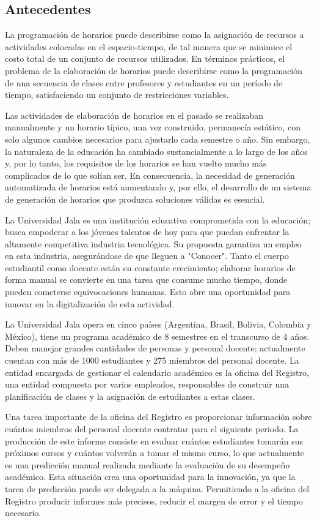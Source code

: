 \subsection{Antecedentes}
La programación de horarios puede describirse como la asignación de recursos a actividades colocadas en el espacio-tiempo, de tal manera que se minimice el costo total de un conjunto de recursos utilizados.
En términos prácticos, el problema de la elaboración de horarios puede describirse como la programación de una secuencia de clases entre profesores y estudiantes en un período de tiempo, satisfaciendo un conjunto de restricciones variables.

Las actividades de elaboración de horarios en el pasado se realizaban manualmente y un horario típico, una vez construido, permanecía estático, con solo algunos cambios necesarios para ajustarlo cada semestre o año.
Sin embargo, la naturaleza de la educación ha cambiado sustancialmente a lo largo de los años y, por lo tanto, los requisitos de los horarios se han vuelto mucho más complicados de lo que solían ser. 
En consecuencia, la necesidad de generación automatizada de horarios está aumentando y, por ello, el desarrollo de un sistema de generación de horarios que produzca soluciones válidas es esencial.

La Universidad Jala es una institución educativa comprometida con la educación; busca empoderar a los jóvenes talentos de hoy para que puedan enfrentar la altamente competitiva industria tecnológica. 
Su propuesta garantiza un empleo en esta industria, asegurándose de que lleguen a "Conocer". Tanto el cuerpo estudiantil como docente están en constante crecimiento; elaborar horarios de forma manual se convierte en una tarea que consume mucho tiempo, donde pueden cometerse equivocaciones humanas. Esto abre una oportunidad para innovar en la digitalización de esta actividad.

La Universidad Jala opera en cinco países (Argentina, Brasil, Bolivia, Colombia y México), tiene un programa académico de 8 semestres en el transcurso de 4 años. Deben manejar grandes cantidades de personas y personal docente; actualmente cuentan con más de 1000 estudiantes y 275 miembros del personal docente. La entidad encargada de gestionar el calendario académico es la oficina del Registro, una entidad compuesta por varios empleados, responsables de construir una planificación de clases y la asignación de estudiantes a estas clases.

Una tarea importante de la oficina del Registro es proporcionar información sobre cuántos miembros del personal docente contratar para el siguiente periodo. La producción de este informe consiste en evaluar cuántos estudiantes tomarán sus próximos cursos y cuántos volverán a tomar el mismo curso, lo que actualmente es una predicción manual realizada mediante la evaluación de su desempeño académico. Esta situación crea una oportunidad para la innovación, ya que la tarea de predicción puede ser delegada a la máquina. Permitiendo a la oficina del Registro producir informes más precisos, reducir el margen de error y el tiempo necesario.

